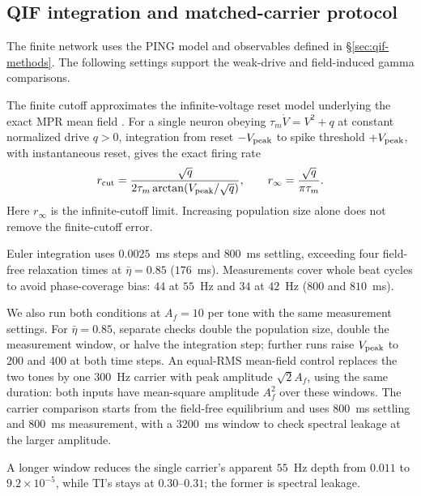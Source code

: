 \subsection{QIF integration and matched-carrier protocol}\label{supp:qif-protocol}
The finite network uses the PING model and observables defined in
\S\ref{sec:qif-methods}. The following settings support the weak-drive and
field-induced gamma comparisons.

The finite cutoff approximates the infinite-voltage reset model underlying the
exact MPR mean field \cite{montbrio2015}. For a single neuron obeying
$\tau_m\dot V=V^2+q$ at constant normalized drive $q>0$, integration from
reset $-V_{\rm peak}$ to spike threshold $+V_{\rm peak}$, with instantaneous
reset, gives the exact firing rate
\[
r_{\rm cut}=\frac{\sqrt q}{2\tau_m\arctan(V_{\rm peak}/\sqrt q)},\qquad
r_{\infty}=\frac{\sqrt q}{\pi\tau_m}.
\]
Here $r_{\infty}$ is the infinite-cutoff limit. Increasing population size
alone does not remove the finite-cutoff error.

Euler integration uses $0.0025$~ms steps and $800$~ms settling, exceeding
four field-free relaxation times at $\bar\eta=0.85$ ($176$~ms).
Measurements cover whole beat cycles to avoid phase-coverage bias:
$44$ at $55$~Hz and $34$ at $42$~Hz ($800$ and $810$~ms).

We also run both conditions at $A_f=10$ per tone with the same measurement
settings. For $\bar\eta=0.85$, separate checks double the population size,
double the measurement window, or halve the integration step; further runs raise
$V_{\rm peak}$ to $200$ and $400$ at both time steps. An equal-RMS
mean-field control replaces the two tones by one $300$~Hz carrier with peak
amplitude $\sqrt{2}A_f$, using the same duration: both inputs have mean-square
amplitude $A_f^2$ over these windows. The carrier comparison starts from the
field-free equilibrium and uses $800$~ms settling and $800$~ms measurement,
with a $3200$~ms window to check spectral leakage at the larger amplitude.

A longer window reduces the single carrier's apparent $55$~Hz
depth from $0.011$ to $9.2\times10^{-5}$, while TI's stays at $0.30$--$0.31$;
the former is spectral leakage.
